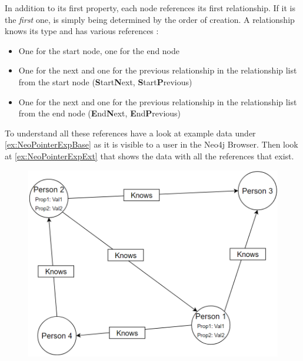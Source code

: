 In addition to its first property, each node references its first relationship. If it is the \emph{first} one, is simply being determined by the order of creation. A relationship knows its type and has various references \cite{NeoInternals}:
\begin{itemize}
\item One for the start node, one for the end node
\item One for the next and one for the previous relationship in the relationship list from the start node (\textbf{S}tart\textbf{N}ext, \textbf{S}tart\textbf{P}revious)
\item One for the next and one for the previous relationship in the relationship list from the end node (\textbf{E}nd\textbf{N}ext, \textbf{E}nd\textbf{P}revious)
\end{itemize}

To understand all these references have a look at example data under \autoref{ex:NeoPointerExpBase} as it is visible to a user in the Neo4j Browser. Then look at \autoref{ex:NeoPointerExpExt} that shows the data with all the references that exist. 
\begin{figure}[h]
\centering
\includegraphics[scale=.5]{Bilder/NeoPointerExpBase.png}
\label{ex:NeoPointerExpBase}
\end{figure}

